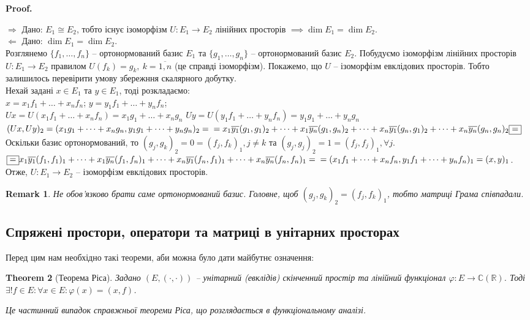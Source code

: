 \documentclass[a4paper, 10pt]{article}
\makeatletter
\def\rightproof{$\boxed{\Rightarrow}$ }
\def\leftproof{$\boxed{\Leftarrow}$ }
\theoremstyle{theoremdd}
\newtheorem{theorem}{Theorem}[subsection]
\newtheorem{remark}[theorem]{Remark}
\renewenvironment{proof}[1][Proof.\\]{\par
\pushQED{\hfill \qed}%
\normalfont \topsep6\p@\@plus6\p@\relax
\trivlist
\item\relax
{\bfseries
#1\@addpunct{.}}\hspace\labelsep\ignorespaces
}{%
\popQED\endtrivlist\@endpefalse
}
\makeatother
\begin{document}
\begin{proof}
\rightproof Дано: $E_1 \cong E_2$, тобто існує ізоморфізм $U \colon E_1 \to E_2$ лінійних просторів $\implies \dim E_1 = \dim E_2$.
\bigskip \\
\leftproof Дано: $\dim E_1 = \dim E_2$.\\
Розглянемо $\{f_1,\dots,f_n\}$ -- ортонормований базис $E_1$ та $\{g_1,\dots,g_n\}$ -- ортонормований базис $E_2$.
Побудуємо ізоморфізм лінійних просторів $U \colon E_1 \to E_2$ правилом $U(f_k) = g_k,\ k = \overline{1,n}$ (це справді ізоморфізм). Покажемо, що $U$ -- ізоморфізм евклідових просторів. Тобто залишилось перевірити умову збережння скалярного добутку.\\
Нехай задані $x \in E_1$ та $y \in E_1$, тоді розкладаємо:\\
$x = x_1 f_1 + \dots + x_n f_n$; \hspace{5cm} $y = y_1 f_1 + \dots + y_n f_n$;\\
$Ux = U(x_1 f_1+\dots+x_n f_n) = x_1 g_1 + \dots + x_n g_n$ \hspace{1cm} $Uy = U(y_1 f_1+\dots+y_n f_n) = y_1 g_1 + \dots + y_n g_n$\\
$(Ux,Uy)_2 = (x_1 g_1+\dots+x_n g_n, y_1 g_1 + \dots + y_n g_n)_2 = \\
= x_1 \overline{y_1} (g_1,g_1)_2 + \dots + x_1 \overline{y_n} (g_1,g_n)_2 + \dots + x_n \overline{y_1} (g_n, g_1)_2 + \dots + x_n \overline{y_n} (g_n,g_n)_2 \boxed{=}$\\
Оскільки базис ортонормований, то $(g_j,g_k)_2 = 0 = (f_j,f_k)_1, j \neq k$ та $(g_j,g_j)_2 = 1 = (f_j,f_j)_1, \forall j$.\\
$\boxed{=} x_1 \overline{y_1} (f_1,f_1)_1 + \dots + x_1 \overline{y_n} (f_1,f_n)_1 + \dots + x_n \overline{y_1} (f_n, f_1)_1 + \dots + x_n \overline{y_n} (f_n,f_n)_1 = \\
= (x_1f_1+\dots+x_nf_n, y_1f_1+\dots+y_nf_n)_1 = (x,y)_1$.\\
Отже, $U \colon E_1 \to E_2$ -- ізоморфізм евклідових просторів.
\end{proof}

\begin{remark}
Не обов'язково брати саме ортонормований базис. Головне, щоб $(g_j,g_k)_2 = (f_j,f_k)_1$, тобто матриці Грама співпадали.
\end{remark}

\subsection{Спряжені простори, оператори та матриці в унітарних просторах}
Перед цим нам необхідно такі теореми, аби можна було дати майбутнє означення:
\begin{theorem}[Теорема Ріса]
Задано $(E,(\cdot,\cdot))$ -- унітарний (евклідів) скінченний простір та лінійний функціонал $\varphi \colon E \to \mathbb{C} (\mathbb{R})$. Тоді $\exists ! f \in E: \forall x \in E: \varphi(x) = (x,f)$.
\end{theorem}
\noindent
\textit{Це частинний випадок справжньої теореми Ріса, що розглядається в функціональному аналізі.}
\end{document}
